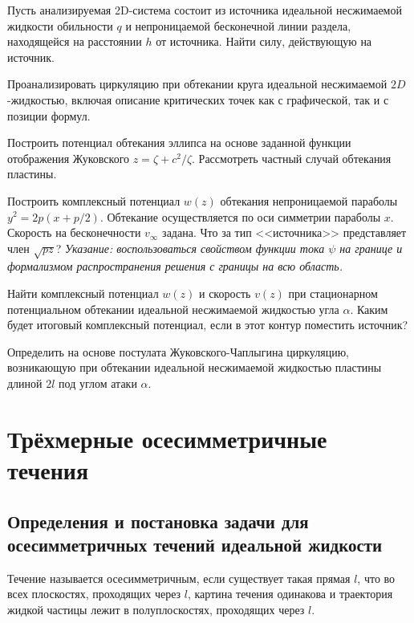 \documentclass[14pt]{extarticle}
\begin{document}
\begin{problems}
	\item
	Пусть анализируемая 2D-система состоит из источника идеальной не\-сжимаемой жидкости обильности $q$  и непроницаемой бесконечной линии раздела, находящейся на расстоянии $h$ от источника. Найти силу, действующую на источник.
	
	\item 
	Проанализировать циркуляцию при обтекании круга идеальной не\-сжи\-маемой $2D$-жидкостью, включая описание критических точек как с графической, так и с позиции формул.
	
	\item 
	Построить потенциал обтекания эллипса на основе заданной функции отображения Жуковского $z = \zeta + c^2/\zeta$. Рассмотреть частный случай обтекания пластины.
	
	\item 
	Построить комплексный потенциал $w(z)$ обтекания непроницаемой параболы $y^2 = 2 p (x+p/2)$. Обтекание осуществляется по оси симметрии параболы $x$. Скорость на бесконечности $v_\infty$  задана.  Что за тип <<источника>> представляет член $\sqrt{pz}$? \textit{Указание: воспользоваться свойством функции тока $\psi$  на границе и формализмом распространения решения с границы на всю область.}
	
	\item
	Найти комплексный потенциал $w(z)$ и скорость $v(z)$ при стационарном потенциальном обтекании идеальной несжимаемой жидкостью угла $\alpha$. Каким будет итоговый комплексный потенциал, если в этот контур поместить источник?
	
	\item
	Определить на основе постулата Жуковского-Чаплыгина циркуляцию, возникающую при обтекании идеальной несжимаемой жидкостью пластины длиной $2l$ под углом атаки $\alpha$.
	
\end{problems}


\newpage
\section{Трёхмерные осесимметричные течения}


\subsection{Определения и постановка задачи для осесимметричных течений идеальной жидкости}



\begin{dfn}
Течение называется \alert{осесимметричным}, если существует такая прямая $l$, что во всех плоскостях, проходящих через $l$, картина течения одинакова и траектория жидкой частицы лежит в полуплоскостях, проходящих через $l$.
\end{dfn}
\end{document}
